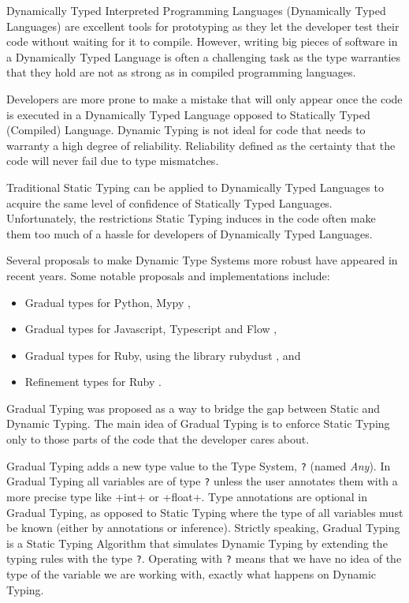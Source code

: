Dynamically Typed Interpreted Programming Languages (Dynamically Typed Languages) are
excellent tools for prototyping as they let the developer test their code without waiting
for it to compile. However, writing big pieces of software in a Dynamically Typed Language
is often a challenging task as the type warranties that they hold are not as strong as in
compiled programming languages.

Developers are more prone to make a mistake that will only appear once the code is
executed in a Dynamically Typed Language opposed to Statically Typed (Compiled) Language.
Dynamic Typing is not ideal for code that needs to warranty a high degree of reliability.
Reliability defined as the certainty that the code will never fail due to type mismatches.

Traditional Static Typing can be applied to Dynamically Typed Languages to acquire the
same level of confidence of Statically Typed Languages.  Unfortunately, the restrictions
Static Typing induces in the code often make them too much of a hassle for developers of
Dynamically Typed Languages.

Several proposals to make Dynamic Type Systems more robust have appeared
in recent years. Some notable proposals and implementations include:

\begin{itemize}
\tightlist
\item Gradual types for Python, Mypy \autocite{lehtosalo2016mypy},
\item Gradual types for Javascript, Typescript
  \autocites{bierman2014understanding}{hejlsberg2012introducing} and Flow
  \autocite{chaudhuri2016flow},
\item Gradual types for Ruby, using the library rubydust \autocite{an_dynamic_2011}, and
\item Refinement types for Ruby \autocite{kazerounian_refinement_2017}.
\end{itemize}

Gradual Typing \autocite{siek_gradual_2006} was proposed as a way to
bridge the gap between Static and Dynamic Typing. The main idea of
Gradual Typing is to enforce Static Typing only to those parts of the
code that the developer cares about.

Gradual Typing adds a new type value to the Type System, \texttt{?}
(named \emph{Any}). In Gradual Typing all variables are of type
\texttt{?} unless the user annotates them with a more precise type like
\pycode+int+ or \pycode+float+. Type annotations are optional in Gradual
Typing, as opposed to Static Typing where the type of all variables must
be known (either by annotations or inference). Strictly speaking,
Gradual Typing is a Static Typing Algorithm that simulates Dynamic
Typing by extending the typing rules with the type \texttt{?}. Operating
with \texttt{?} means that we have no idea of the type of the variable
we are working with, exactly what happens on Dynamic Typing.

